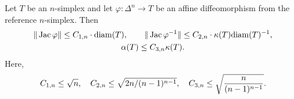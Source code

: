 \documentclass[10pt,letterpaper]{article}
\begin{document}
\begin{lemma}\label{lemma:affinetransform}
    Let $T$ be an $n$-simplex and let $\varphi : \Delta^{n} \rightarrow T$ be an affine diffeomorphism from the reference $n$-simplex. Then 
    \begin{gather*}
        \| \Jacobian \varphi \|
        \leq 
        \Ceins{n} \cdot \diam(T) %
        ,
        \qquad 
        \| \Jacobian \varphi^{-1} \|
        \leq 
        \Czwei{n} \cdot 
        \kappa(T) 
        \diam(T)^{-1}
        ,
        \\
        \alpha(T)
        \leq 
        \Csechs{n}
        \kappa(T)
        .
    \end{gather*}
    Here,
    \begin{align*}
        C_{1,n} \leq \sqrt{n},
        \quad 
        C_{2,n} \leq \sqrt{ 2n/(n-1)^{n-1} },
        \quad 
        C_{3,n} \leq \sqrt{ \frac{n}{ (n-1)^{n-1} } }
        . 
    \end{align*}
\end{lemma}
\end{document}

